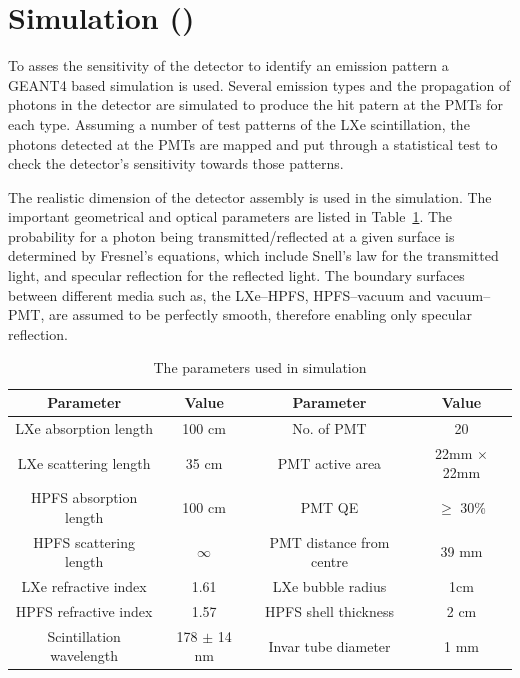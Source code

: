 \section{Simulation ()}
\label{sec:sim}
To asses the sensitivity of the detector to identify an emission pattern a GEANT4 based simulation is used. 
Several emission types and the propagation of photons in the detector are simulated to produce the hit patern  
at the PMTs for each type. 
Assuming a number of test patterns of the LXe scintillation, the photons detected at the PMTs are mapped and put 
through a statistical test to check the detector's sensitivity towards those patterns.

The realistic dimension of the detector assembly is used in the simulation. The important 
geometrical and optical parameters are listed in Table~\ref{tab:OptPar}. 
The probability for a photon being transmitted/reflected at a given surface is 
determined by Fresnel's equations, which include Snell's law for the transmitted light, 
and specular reflection for the reflected light. The boundary surfaces between different media
such as, the LXe--HPFS, HPFS--vacuum and vacuum--PMT, are assumed to be perfectly smooth, 
therefore enabling only specular reflection.

\begin{table}[h]
  \centering
  \caption{The parameters used in simulation}
  \label{tab:OptPar}
  \begin{tabular}{|c c||c c|}
  \hline
  Parameter & Value & Parameter & Value \\
  \hline
  LXe absorption length & 100 cm & No. of PMT & 20\\
  LXe scattering length & 35 cm & PMT active area & 22mm $\times$ 22mm\\
  HPFS absorption length & 100 cm & PMT QE & $\geq$ 30\% \\
  HPFS scattering length & $\infty$ & PMT distance from centre & 39 mm\\
  LXe refractive index & 1.61 & LXe bubble radius & 1cm\\
  HPFS refractive index & 1.57 & HPFS shell thickness & 2 cm \\
  Scintillation wavelength & 178 $\pm$ 14 nm & Invar tube diameter & 1 mm\\
  \hline
 \end{tabular}
\end{table}

